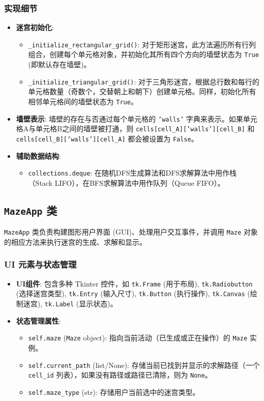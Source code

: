 \documentclass[UTF8]{report}
\theoremstyle{MyLineTheoremStyle} %
\theoremstyle{MyBlockTheoremStyle} %
\theoremstyle{MySubsubsectionStyle} %
\begin{document}
\subsubsection{实现细节}
\begin{itemize}
    \item \textbf{迷宫初始化}:
    \begin{itemize}
        \item \texttt{\_initialize\_rectangular\_grid()}: 对于矩形迷宫，此方法遍历所有行列组合，创建每个单元格对象，并初始化其所有四个方向的墙壁状态为 \texttt{True} (即默认存在墙壁)。
        \item \texttt{\_initialize\_triangular\_grid()}: 对于三角形迷宫，根据总行数和每行的单元格数量（奇数个，交替朝上和朝下）创建单元格。同样，初始化所有相邻单元格间的墙壁状态为 \texttt{True}。
    \end{itemize}
    \item \textbf{墙壁表示}: 墙壁的存在与否通过每个单元格的 \texttt{'walls'} 字典来表示。如果单元格A与单元格B之间的墙壁被打通，则 \texttt{cells[cell\_A]['walls'][cell\_B]} 和 \texttt{cells[cell\_B]['walls'][cell\_A]} 都会被设置为 \texttt{False}。
    \item \textbf{辅助数据结构}:
    \begin{itemize}
        \item \texttt{collections.deque}: 在随机DFS生成算法和DFS求解算法中用作栈（Stack LIFO），在BFS求解算法中用作队列（Queue FIFO）。
    \end{itemize}
\end{itemize}

\subsection{\texttt{MazeApp} 类}
\texttt{MazeApp} 类负责构建图形用户界面 (GUI)、处理用户交互事件，并调用 \texttt{Maze} 对象的相应方法来执行迷宫的生成、求解和显示。

\subsubsection{UI 元素与状态管理}
\begin{itemize}
    \item \textbf{UI组件}: 包含多种 Tkinter 控件，如 \texttt{tk.Frame} (用于布局), \texttt{tk.Radiobutton} (选择迷宫类型), \texttt{tk.Entry} (输入尺寸), \texttt{tk.Button} (执行操作), \texttt{tk.Canvas} (绘制迷宫), \texttt{tk.Label} (显示状态)。
    \item \textbf{状态管理属性}:
    \begin{itemize}
        \item \texttt{self.maze} (\texttt{Maze} object): 指向当前活动（已生成或正在操作）的 \texttt{Maze} 实例。
        \item \texttt{self.current\_path} (list/None): 存储当前已找到并显示的求解路径（一个 \texttt{cell\_id} 列表），如果没有路径或路径已清除，则为 \texttt{None}。
        \item \texttt{self.maze\_type} (str): 存储用户当前选中的迷宫类型。
    \end{itemize}
\end{itemize}
\end{document}

